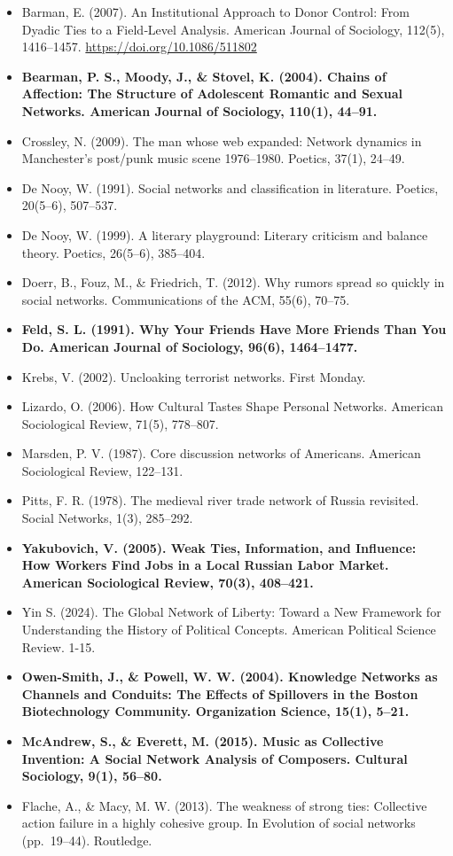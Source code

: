\documentclass[
]{book}
\begin{document}
\begin{itemize}
\item
  Barman, E. (2007). An Institutional Approach to Donor Control: From Dyadic Ties to a Field‐Level Analysis. American Journal of Sociology, 112(5), 1416--1457. \url{https://doi.org/10.1086/511802}
\item
  \textbf{Bearman, P. S., Moody, J., \& Stovel, K. (2004). Chains of Affection: The Structure of Adolescent Romantic and Sexual Networks. American Journal of Sociology, 110(1), 44--91.}
\item
  Crossley, N. (2009). The man whose web expanded: Network dynamics in Manchester's post/punk music scene 1976--1980. Poetics, 37(1), 24--49.
\item
  De Nooy, W. (1991). Social networks and classification in literature. Poetics, 20(5--6), 507--537.
\item
  De Nooy, W. (1999). A literary playground: Literary criticism and balance theory. Poetics, 26(5--6), 385--404.
\item
  Doerr, B., Fouz, M., \& Friedrich, T. (2012). Why rumors spread so quickly in social networks. Communications of the ACM, 55(6), 70--75.
\item
  \textbf{Feld, S. L. (1991). Why Your Friends Have More Friends Than You Do. American Journal of Sociology, 96(6), 1464--1477.}
\item
  Krebs, V. (2002). Uncloaking terrorist networks. First Monday.
\item
  Lizardo, O. (2006). How Cultural Tastes Shape Personal Networks. American Sociological Review, 71(5), 778--807.
\item
  Marsden, P. V. (1987). Core discussion networks of Americans. American Sociological Review, 122--131.
\item
  Pitts, F. R. (1978). The medieval river trade network of Russia revisited. Social Networks, 1(3), 285--292.
\item
  \textbf{Yakubovich, V. (2005). Weak Ties, Information, and Influence: How Workers Find Jobs in a Local Russian Labor Market. American Sociological Review, 70(3), 408--421.}
\item
  Yin S. (2024). The Global Network of Liberty: Toward a New Framework for Understanding the History of Political Concepts. American Political Science Review. 1-15.
\item
  \textbf{Owen-Smith, J., \& Powell, W. W. (2004). Knowledge Networks as Channels and Conduits: The Effects of Spillovers in the Boston Biotechnology Community. Organization Science, 15(1), 5--21.}
\item
  \textbf{McAndrew, S., \& Everett, M. (2015). Music as Collective Invention: A Social Network Analysis of Composers. Cultural Sociology, 9(1), 56--80.}
\item
  Flache, A., \& Macy, M. W. (2013). The weakness of strong ties: Collective action failure in a highly cohesive group. In Evolution of social networks (pp.~19--44). Routledge.
\end{itemize}

  
\end{document}
